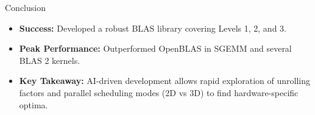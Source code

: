 \documentclass[aspectratio=169]{beamer}
\begin{document}
\begin{frame}{Conclusion}
  \begin{itemize}
    \item \textbf{Success:} Developed a robust BLAS library covering Levels 1, 2, and 3.
    \item \textbf{Peak Performance:} Outperformed OpenBLAS in SGEMM and several BLAS 2 kernels.
    \item \textbf{Key Takeaway:} AI-driven development allows rapid exploration of unrolling factors and parallel scheduling modes (2D vs 3D) to find hardware-specific optima.
  \end{itemize}
\end{frame}
\end{document}
